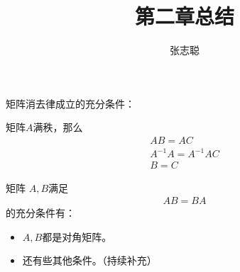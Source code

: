 \documentclass{article}
\begin{document}
\title{第二章总结}
\author{张志聪}
\maketitle

\begin{zremark}
  矩阵消去律成立的充分条件：

  矩阵$A$满秩，那么
  \begin{align*}
    AB = AC               \\
    A^{-1} A = A^{-1} A C \\
    B = C
  \end{align*}
\end{zremark}

\begin{zremark}
  矩阵 $A, B$满足
  \begin{align*}
    AB = BA
  \end{align*}
  的充分条件有：
  \begin{itemize}
    \item $A,B$都是对角矩阵。
    \item 还有些其他条件。（持续补充）
  \end{itemize}
\end{zremark}
\end{document}
